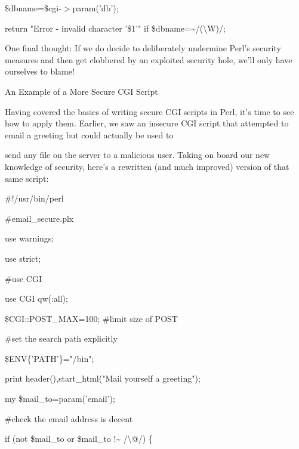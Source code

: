 \documentclass[a4paper,11pt]{book}
\begin{document}
\noindent 

\noindent 

\noindent \$dbname=\$cgi-$>$param('db');

\noindent return "Error - invalid character '\$1'" if \$dbname=\~{}/(\textbackslash W)/;

\noindent 

\noindent One final thought: If we do decide to deliberately undermine Perl's security measures and then get clobbered by an exploited security hole, we'll only have ourselves to blame!

\noindent 

\noindent 

\noindent An Example of a More Secure CGI Script

\noindent 

\noindent Having covered the basics of writing secure CGI scripts in Perl, it's time to see how to apply them. Earlier, we saw an insecure CGI script that attempted to email a greeting but could actually be used to

\noindent send any file on the server to a malicious user. Taking on board our new knowledge of security, here's a rewritten (and much improved) version of that same script:

\noindent 

\noindent \#!/usr/bin/perl

\noindent \#email\_secure.plx

\noindent use warnings;

\noindent use strict;

\noindent 

\noindent \#use CGI

\noindent use CGI qw(:all);

\noindent \$CGI::POST\_MAX=100; \#limit size of POST

\noindent 

\noindent \#set the search path explicitly

\noindent \$ENV\{'PATH'\}="/bin";

\noindent 

\noindent print header(),start\_html("Mail yourself a greeting");

\noindent my \$mail\_to=param('email');

\noindent 

\noindent \#check the email address is decent

\noindent if (not \$mail\_to or \$mail\_to !\~{} /\textbackslash @/) \{
\end{document}
